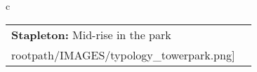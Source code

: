 \begin{table}[H]
        \begin{tabular}{c}
        \begin{tabular}{m{1.5in} m{2in}}
\textbf{Stapleton:} {Mid-rise in the park} & \texttt{[image: \\rootpath/IMAGES/typology\_towerpark.png]}
\end{tabular}\end{tabular}
        \end{table}
